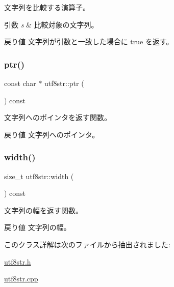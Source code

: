 文字列を比較する演算子。 
\begin{DoxyParams}{引数}
{\em s} & 比較対象の文字列。 \\
\hline
\end{DoxyParams}
\begin{DoxyReturn}{戻り値}
文字列が引数と一致した場合に true を返す。 
\end{DoxyReturn}
\hypertarget{classutf8str_a93ef54e383307f426508eb4b88a3a7b9}{}\label{classutf8str_a93ef54e383307f426508eb4b88a3a7b9} 
\subsubsection{\texorpdfstring{ptr()}{ptr()}}
{\footnotesize\ttfamily const char $\ast$ utf8str\+::ptr (\begin{DoxyParamCaption}{ }\end{DoxyParamCaption}) const}

文字列へのポインタを返す関数。 \begin{DoxyReturn}{戻り値}
文字列へのポインタ。 
\end{DoxyReturn}
\hypertarget{classutf8str_ab62898084f6b49c7f318e91dbe3e5eb1}{}\label{classutf8str_ab62898084f6b49c7f318e91dbe3e5eb1} 
\subsubsection{\texorpdfstring{width()}{width()}}
{\footnotesize\ttfamily size\+\_\+t utf8str\+::width (\begin{DoxyParamCaption}{ }\end{DoxyParamCaption}) const}

文字列の幅を返す関数。 \begin{DoxyReturn}{戻り値}
文字列の幅。 
\end{DoxyReturn}


このクラス詳解は次のファイルから抽出されました\+:\begin{DoxyCompactItemize}
\item 
\hyperlink{utf8str_8h}{utf8str.\+h}\item 
\hyperlink{utf8str_8cpp}{utf8str.\+cpp}\end{DoxyCompactItemize}
